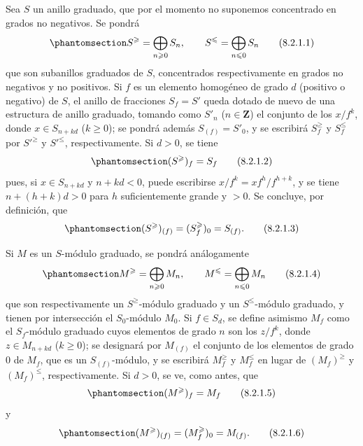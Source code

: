 \documentclass[oneside,10pt]{amsart}
\renewcommand{\leq}{\leqslant}
\renewcommand{\geq}{\geqslant}
\let\EGAOriginalLabel\label
\renewcommand{\label}[1]{\phantomsection\EGAOriginalLabel{#1}}
\begin{document}
\begin{env}[8.2.1]
\label{II.8.2.1-fr}
Sea $S$ un anillo graduado, que por el momento no suponemos concentrado en grados no negativos.
Se pondrá
\begin{equation}
\label{II.8.2.1.1-fr}
  S^{\geq}=\bigoplus_{n\geq0}S_n,
  \qquad
  S^{\leq}=\bigoplus_{n\leq0}S_n
\tag{8.2.1.1}
\end{equation}
que son subanillos graduados de $S$, concentrados respectivamente en grados no negativos y no positivos.
Si $f$ es un elemento homogéneo de grado $d$ (positivo o negativo) de $S$, el anillo de fracciones $S_f=S'$ queda dotado de nuevo de una estructura de anillo graduado, tomando como $S'_n$ ($n\in\mathbf{Z}$) el conjunto de los $x/f^k$, donde $x\in S_{n+kd}$ ($k\geq0$);
se pondrá además $S_{(f)}=S'_0$, y se escribirá $S_f^{\geq}$ y $S_f^{\leq}$ por $S'^{\geq}$ y $S'^{\leq}$, respectivamente.
Si $d>0$, se tiene
\begin{equation}
\label{II.8.2.1.2-fr}
  (S^{\geq})_f=S_f
\tag{8.2.1.2}
\end{equation}
pues, si $x\in S_{n+kd}$ y $n+kd<0$, puede escribirse $x/f^k=xf^h/f^{h+k}$, y se tiene $n+(h+k)d>0$ para $h$ suficientemente grande y $>0$.
Se concluye, por definición, que
\begin{equation}
\label{II.8.2.1.3-fr}
  (S^{\geq})_{(f)}=(S_f^{\geq})_0=S_{(f)}.
\tag{8.2.1.3}
\end{equation}

Si $M$ es un $S$-módulo graduado, se pondrá análogamente
\begin{equation}
\label{II.8.2.1.4-fr}
  M^{\geq}=\bigoplus_{n\geq0}M_n,
  \qquad
  M^{\leq}=\bigoplus_{n\leq0}M_n
\tag{8.2.1.4}
\end{equation}
que son respectivamente un $S^{\geq}$-módulo graduado y un $S^{\leq}$-módulo graduado, y tienen por intersección el $S_0$-módulo $M_0$.
Si $f\in S_d$, se define asimismo $M_f$ como el $S_f$-módulo graduado cuyos elementos de grado $n$ son los $z/f^k$, donde $z\in M_{n+kd}$ ($k\geq0$);
se designará por $M_{(f)}$ el conjunto de los elementos de grado $0$ de $M_f$, que es un $S_{(f)}$-módulo, y se escribirá $M_f^{\geq}$ y $M_f^{\leq}$ en lugar de $(M_f)^{\geq}$ y $(M_f)^{\leq}$, respectivamente.
Si $d>0$, se ve, como antes, que
\begin{equation}
\label{II.8.2.1.5-fr}
  (M^{\geq})_f=M_f
\tag{8.2.1.5}
\end{equation}
y
\begin{equation}
\label{II.8.2.1.6-fr}
  (M^{\geq})_{(f)}=(M_f^{\geq})_0=M_{(f)}.
\tag{8.2.1.6}
\end{equation}
\end{env}
\end{document}
